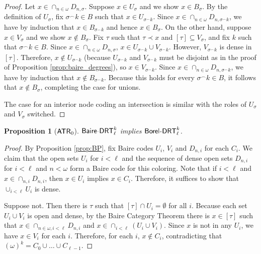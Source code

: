 \documentclass{amsart}
\newtheorem{prop}[thm]{Proposition}
\theoremstyle{definition}
\theoremstyle{remark}
\newcommand{\system}[1]{\mbox{\fontfamily{cmss}\fontshape{n}\fontseries{m}%
    \selectfont#1}}
\newcommand{\ATR}{\system{ATR}\ensuremath{_0}}
\newcommand{\BoDRT}{\system{Borel-DRT}}
\newcommand{\BaDRT}{\system{Baire-DRT}}
\begin{document}
\begin{proof}
Let $x \in \cap_{n \in \omega} D_{n, \sigma}$. Suppose $x \in U_{\sigma}$ and we show $x \in B_{\sigma}$. By the definition of $U_{\sigma}$, fix 
$\sigma^{\smallfrown}k \in B$ such that $x \in U_{\sigma^{\smallfrown}k}$. Since $x \in \cap_{n \in \omega} D_{n, \sigma^{\smallfrown}k}$, we have by induction that 
$x \in B_{\sigma^{\smallfrown}k}$ and hence $x \in B_{\sigma}$. On the other hand, suppose $x \in V_{\sigma}$ and we show $x \not \in B_{\sigma}$. Fix $\tau$ such that 
$\tau \prec x$ and $[\tau] \subseteq V_{\sigma}$, and fix $k$ such that 
$\sigma^{\smallfrown}k \in B$. Since $x \in \cap_{n \in \omega} D_{n,\sigma}$, $x \in U_{\sigma^{\smallfrown}k} \cup V_{\sigma^{\smallfrown}k}$. However, 
$V_{\sigma^{\smallfrown}k}$ is dense in $[\tau]$. Therefore, $x \not \in U_{\sigma^{\smallfrown}k}$ (because $U_{\sigma^{\smallfrown}k}$ and $V_{\sigma^{\smallfrown}k}$ 
must be disjoint as in the proof of Proposition \ref{prop:baire_degrees}), 
so $x \in V_{\sigma^{\smallfrown}k}$. Since $x \in \cap_{n \in \omega} D_{n,\sigma^{\smallfrown}k}$, we have by induction that 
$x \not \in B_{\sigma^{\smallfrown}k}$. Because this holds for every $\sigma^{\smallfrown}k \in B$, it follows that $x \not \in B_{\sigma}$, completing the case for unions.

The case for an interior node coding an intersection is similar with the roles of $U_{\sigma}$ and $V_{\sigma}$ switched.\end{proof}




\begin{prop}[$\ATR$]
$\BaDRT^k_{\ell}$ implies $\BoDRT^k_{\ell}$.
\end{prop}

\begin{proof}
By Proposition \ref{prop:BP},
fix Baire codes $U_i$, $V_i$ and $D_{n,i}$ for each $C_i$. We claim that the open sets $U_i$ for $i < \ell$ and 
the sequence of dense open sets $D_{n,i}$ for $i < \ell$ and $n < \omega$ form a Baire code for this coloring. Note that if $i < \ell$ and $x \in \cap_{n,i} D_{n,i}$, 
then $x \in U_i$ implies $x \in C_i$. Therefore, it suffices to show that $\cup_{i < \ell} U_i$ is dense.

Suppose not.  Then there is $\tau$ such that $[\tau] \cap U_i = \emptyset$ for all $i$.  Because each set $U_i \cup V_i$ is open and dense, by the 
Baire Category Theorem there is $x \in [\tau]$ such that $x \in \cap_{n\in \omega, i<\ell} D_{n,i}$ and 
$x \in \cap_{i < \ell} (U_i \cup V_i)$.  Since $x$ is not in any $U_i$, we have $x \in V_i$ for each $i$. Therefore, for each $i$, $x \not\in C_i$, 
contradicting that $(\omega)^k = C_0 \cup \dots \cup C_{\ell-1}$.
\end{proof}
\end{document}
